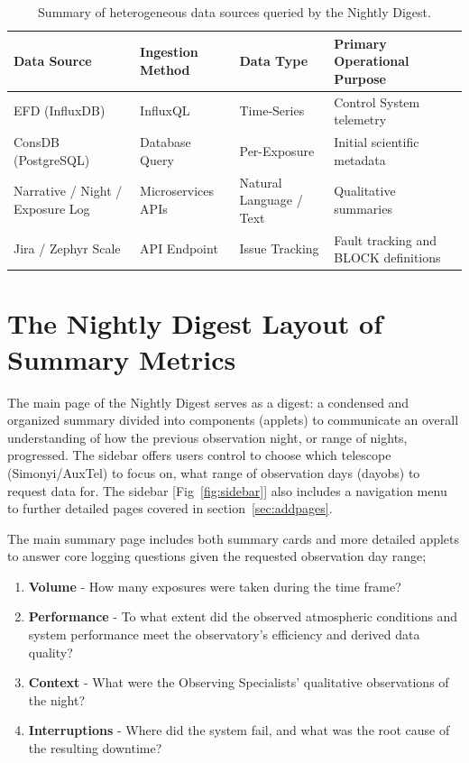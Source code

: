 \begin{table}[ht]
\caption{Summary of heterogeneous data sources queried by the Nightly Digest.}
\label{tab:data_sources}
\begin{center}
\begin{tabular}{|p{}|p{}|p{}|p{}|}
\hline
\rule[-1ex]{0pt}{3.5ex} \textbf{Data Source} & \textbf{Ingestion Method} & \textbf{Data Type} & \textbf{Primary Operational Purpose} \\
\hline
\rule[-1ex]{0pt}{3.5ex} EFD (InfluxDB) & InfluxQL & Time-Series & Control System telemetry \\
\hline
\rule[-1ex]{0pt}{3.5ex} ConsDB (PostgreSQL) & Database Query & Per-Exposure & Initial scientific metadata \\
\hline
\rule[-1ex]{0pt}{3.5ex} Narrative / Night / Exposure Log & Microservices APIs & Natural Language / Text & Qualitative summaries \\
\hline
\rule[-1ex]{0pt}{3.5ex} Jira / Zephyr Scale & API Endpoint & Issue Tracking & Fault tracking and BLOCK definitions \\
\hline
\end{tabular}
\end{center}
\end{table}

\section{The Nightly Digest Layout of Summary Metrics}

The main page of the Nightly Digest serves as a digest: a condensed and organized summary
divided into components (applets) to communicate an overall understanding of how the
previous observation night, or range of nights, progressed. The sidebar offers
users control to choose which telescope (Simonyi/AuxTel) to focus on, what range of
observation days (dayobs) to request data for. The sidebar [Fig~\ref{fig:sidebar}]
also includes a navigation menu to further detailed pages covered in section~\ref{sec:addpages}.

The main summary page includes both summary cards and more detailed applets to answer core
logging questions given the requested observation day range;

\begin{enumerate}
\label{sec:corequestions}
\item\textbf{Volume} - How many exposures were taken during the time frame?
\item\textbf{Performance} - To what extent did the observed atmospheric conditions and system performance meet the
  observatory’s efficiency and derived data quality?
\item\textbf{Context} - What were the Observing Specialists’ qualitative observations of the night?
\item\textbf{Interruptions} - Where did the system fail, and what was the root cause of the resulting downtime?
\end{enumerate}

